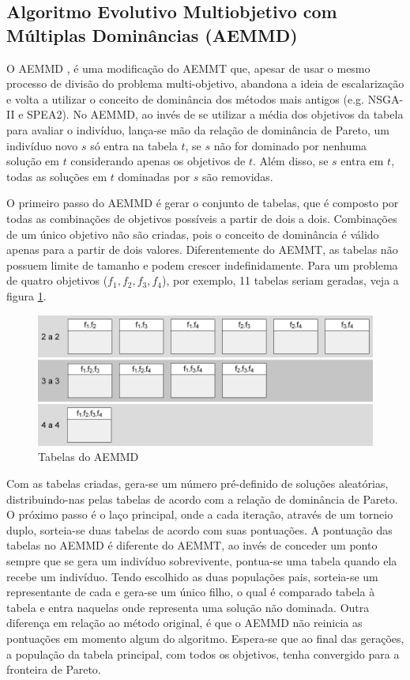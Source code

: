 \subsection{Algoritmo Evolutivo Multiobjetivo com Múltiplas Dominâncias (AEMMD)}
\label{section_aemmd}

O AEMMD \cite{Lafeta2016}, é uma modificação do AEMMT que, apesar de usar o mesmo processo de divisão do problema multi-objetivo, abandona a ideia de escalarização e volta a utilizar o conceito de dominância dos métodos mais antigos (e.g. NSGA-II e SPEA2). No AEMMD, ao invés de se utilizar a média dos objetivos da tabela para avaliar o indivíduo, lança-se mão da relação de dominância de Pareto, um indivíduo novo $s$ só entra na tabela $t$, se $s$ não for dominado por nenhuma solução em $t$ considerando apenas os objetivos de $t$. Além disso, se $s$ entra em $t$, todas as soluções em $t$ dominadas por $s$ são removidas.

O primeiro passo do AEMMD é gerar o conjunto de tabelas, que é composto por todas as combinações de objetivos possíveis a partir de dois a dois. Combinações de um único objetivo não são criadas, pois o conceito de dominância é válido apenas para a partir de dois valores. Diferentemente do AEMMT, as tabelas não possuem limite de tamanho e podem crescer indefinidamente. Para um problema de quatro objetivos ($f_1, f_2, f_3, f_4$), por exemplo, 11 tabelas seriam geradas, veja a figura \ref{fig_aemmd_tabelas}.

\begin{figure}
	\label{fig_aemmd_tabelas}
	\caption{Tabelas do AEMMD}
	\centering
	\includegraphics[width=1\textwidth]{cap_otimizacao-multi/figs/aeemd-tabelas}
\end{figure}

Com as tabelas criadas, gera-se um número pré-definido de soluções aleatórias, distribuindo-nas pelas tabelas de acordo com a relação de dominância de Pareto. O próximo passo é o laço principal, onde a cada iteração, através de um torneio duplo, sorteia-se duas tabelas de acordo com suas pontuações. A pontuação das tabelas no AEMMD é diferente do AEMMT, ao invés de conceder um ponto sempre que se gera um indivíduo sobrevivente, pontua-se uma tabela quando ela recebe um indivíduo. Tendo escolhido as duas populações pais, sorteia-se um representante de cada e gera-se um único filho, o qual é comparado tabela à tabela e entra naquelas onde representa uma solução não dominada. Outra diferença em relação ao método original, é que o AEMMD não reinicia as pontuações em momento algum do algoritmo. Espera-se que ao final das gerações, a população da tabela principal, com todos os objetivos, tenha convergido para a fronteira de Pareto. 

